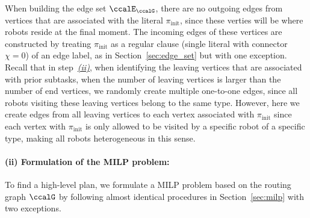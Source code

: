 \documentclass[Afour,sageh,times]{sagej}
\begin{document}
{{{  When  building the edge set $\ccalE_\ccalG$, there are no outgoing edges from  vertices that are associated with the literal $\pi_\text{init}$, since these verties will be where robots reside at the final moment. The incoming edges of these vertices are constructed by treating $\pi_{\text{init}}$ as a regular clause (single literal with connector $\chi=0$) of an edge label, as in Section~\ref{sec:edge_set} but with one exception.  Recall that in step~\hyperref[sec:a]{\it {(ii)}}, when identifying the leaving vertices that are associated with prior subtasks,  when the number of leaving vertices is larger than the number of end vertices, we randomly create multiple  one-to-one edges, since all robots visiting these leaving vertices belong to the same type. However, here we create edges from all leaving vertices to each vertex associated with $\pi_{\text{init}}$ since each vertex with $\pi_{\text{init}}$ is only allowed to be visited by a specific robot of a specific type, making all robots heterogeneous in this sense.

 \paragraph{(ii) Formulation of the MILP problem:}  To find a high-level plan, we formulate a MILP problem based on the routing graph $\ccalG$ by following almost identical procedures in Section~\ref{sec:milp} with two exceptions.

}}}
\end{document}
